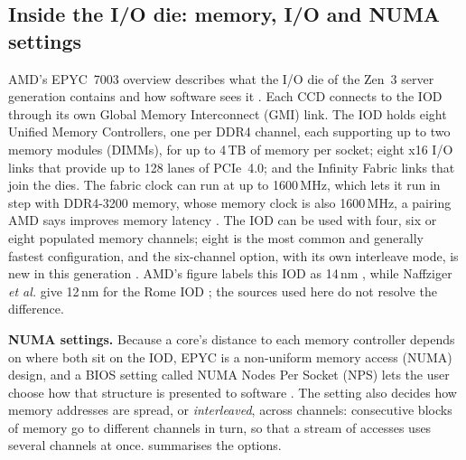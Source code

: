 \subsection{Inside the I/O die: memory, I/O and NUMA settings}
\label{sec:iod-detail}
AMD's EPYC~7003 overview describes what the I/O die of the Zen~3 server generation contains and how software sees it \cite{amd2022epyc7003}. Each CCD connects to the IOD through its own Global Memory Interconnect (GMI) link. The IOD holds eight Unified Memory Controllers, one per DDR4 channel, each supporting up to two memory modules (DIMMs), for up to 4\,TB of memory per socket; eight x16 I/O links that provide up to 128 lanes of PCIe~4.0; and the Infinity Fabric links that join the dies. The fabric clock can run at up to 1600\,MHz, which lets it run in step with DDR4-3200 memory, whose memory clock is also 1600\,MHz, a pairing AMD says improves memory latency \cite{amd2022epyc7003}. The IOD can be used with four, six or eight populated memory channels; eight is the most common and generally fastest configuration, and the six-channel option, with its own interleave mode, is new in this generation \cite{amd2022epyc7003}. AMD's figure labels this IOD as 14\,nm \cite[Fig.~2-4]{amd2022epyc7003}, while Naffziger \emph{et al.} give 12\,nm for the Rome IOD \cite{naffziger2020chiplet}; the sources used here do not resolve the difference.

\textbf{NUMA settings.} Because a core's distance to each memory controller depends on where both sit on the IOD, EPYC is a non-uniform memory access (NUMA) design, and a BIOS setting called NUMA Nodes Per Socket (NPS) lets the user choose how that structure is presented to software \cite{amd2022epyc7003}. The setting also decides how memory addresses are spread, or \emph{interleaved}, across channels: consecutive blocks of memory go to different channels in turn, so that a stream of accesses uses several channels at once.  summarises the options.

